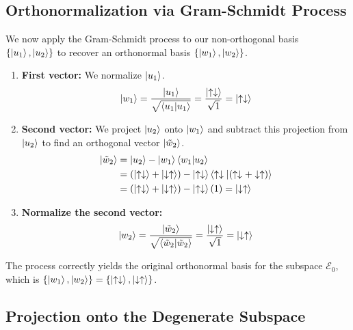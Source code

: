 \documentclass[11pt,a4paper]{article}
\begin{document}
\subsection{Orthonormalization via Gram-Schmidt Process}

We now apply the Gram-Schmidt process to our non-orthogonal basis $\{\ket{u_1}, \ket{u_2}\}$ to recover an orthonormal basis $\{\ket{w_1}, \ket{w_2}\}$.
\begin{enumerate}
    \item \textbf{First vector:} We normalize $\ket{u_1}$.
    \begin{equation}
        \ket{w_1} = \frac{\ket{u_1}}{\sqrt{\braket{u_1|u_1}}} = \frac{\ket{\uparrow\downarrow}}{\sqrt{1}} = \ket{\uparrow\downarrow}
    \end{equation}

    \item \textbf{Second vector:} We project $\ket{u_2}$ onto $\ket{w_1}$ and subtract this projection from $\ket{u_2}$ to find an orthogonal vector $\ket{\tilde{w}_2}$.
    \begin{align}
        \ket{\tilde{w}_2} &= \ket{u_2} - \ket{w_1}\braket{w_1|u_2} \nonumber \\
        &= (\ket{\uparrow\downarrow} + \ket{\downarrow\uparrow}) - \ket{\uparrow\downarrow}\braket{\uparrow\downarrow|(\uparrow\downarrow + \downarrow\uparrow)} \nonumber \\
        &= (\ket{\uparrow\downarrow} + \ket{\downarrow\uparrow}) - \ket{\uparrow\downarrow}(1) = \ket{\downarrow\uparrow}
    \end{align}

    \item \textbf{Normalize the second vector:}
    \begin{equation}
        \ket{w_2} = \frac{\ket{\tilde{w}_2}}{\sqrt{\braket{\tilde{w}_2|\tilde{w}_2}}} = \frac{\ket{\downarrow\uparrow}}{\sqrt{1}} = \ket{\downarrow\uparrow}
    \end{equation}
\end{enumerate}
The process correctly yields the original orthonormal basis for the subspace $\mathcal{E}_0$, which is $\{\ket{w_1}, \ket{w_2}\} = \{\ket{\uparrow\downarrow}, \ket{\downarrow\uparrow}\}$.

\subsection{Projection onto the Degenerate Subspace}
\end{document}
